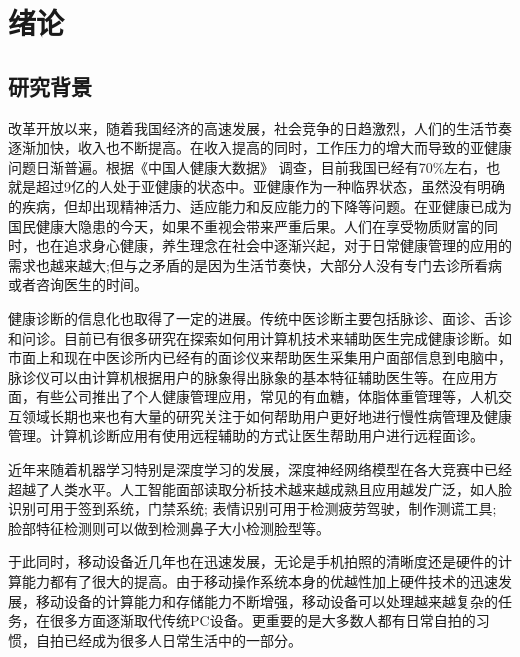 \chapter{绪论}

\section{研究背景}
改革开放以来，随着我国经济的高速发展，社会竞争的日趋激烈，人们的生活节奏逐渐加快，收入也不断提高。在收入提高的同时，工作压力的增大而导致的亚健康问题日渐普遍。根据《中国人健康大数据》\cite{中国人健康大数据} 调查，目前我国已经有70\%左右，也就是超过9亿的人处于亚健康的状态中。亚健康作为一种临界状态，虽然没有明确的疾病，但却出现精神活力、适应能力和反应能力的下降等问题。在亚健康已成为国民健康大隐患的今天，如果不重视会带来严重后果。人们在享受物质财富的同时，也在追求身心健康，养生理念在社会中逐渐兴起，对于日常健康管理的应用的需求也越来越大;但与之矛盾的是因为生活节奏快，大部分人没有专门去诊所看病或者咨询医生的时间。



健康诊断的信息化也取得了一定的进展。传统中医诊断主要包括脉诊、面诊、舌诊和问诊。目前已有很多研究在探索如何用计算机技术来辅助医生完成健康诊断。如市面上和现在中医诊所内已经有的面诊仪来帮助医生采集用户面部信息到电脑中，脉诊仪可以由计算机根据用户的脉象得出脉象的基本特征辅助医生等\cite{Zhang2018Study2}。在应用方面，有些公司推出了个人健康管理应用，常见的有血糖，体脂体重管理等，人机交互领域长期也来也有大量的研究关注于如何帮助用户更好地进行慢性病管理及健康管理。计算机诊断应用有使用远程辅助的方式让医生帮助用户进行远程面诊。

近年来随着机器学习特别是深度学习的发展，深度神经网络模型在各大竞赛中已经超越了人类水平。人工智能面部读取分析技术越来越成熟且应用越发广泛，如人脸识别可用于签到系统，门禁系统; 表情识别可用于检测疲劳驾驶，制作测谎工具; 脸部特征检测则可以做到检测鼻子大小检测脸型等。

于此同时，移动设备近几年也在迅速发展，无论是手机拍照的清晰度还是硬件的计算能力都有了很大的提高。由于移动操作系统本身的优越性加上硬件技术的迅速发展，移动设备的计算能力和存储能力不断增强，移动设备可以处理越来越复杂的任务，在很多方面逐渐取代传统PC设备。更重要的是大多数人都有日常自拍的习惯，自拍已经成为很多人日常生活中的一部分。



